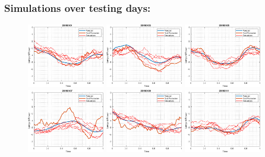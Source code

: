 \documentclass[aspectratio=169]{beamer}\usepackage[utf8]{inputenc}
\begin{document}
\begin{frame}\frametitle{Simulations over testing days:}

\begin{figure}[ht!]
\centering
\includegraphics[width=0.3\textwidth]{../../MATLAB_Files/Results/paths_testing_days/lamperti_optimal/1.eps}
\includegraphics[width=0.3\textwidth]{../../MATLAB_Files/Results/paths_testing_days/lamperti_optimal/2.eps}
\includegraphics[width=0.3\textwidth]{../../MATLAB_Files/Results/paths_testing_days/lamperti_optimal/3.eps}
\includegraphics[width=0.3\textwidth]{../../MATLAB_Files/Results/paths_testing_days/lamperti_optimal/4.eps}
\includegraphics[width=0.3\textwidth]{../../MATLAB_Files/Results/paths_testing_days/lamperti_optimal/5.eps}
\includegraphics[width=0.3\textwidth]{../../MATLAB_Files/Results/paths_testing_days/lamperti_optimal/6.eps}
\end{figure}

\end{frame}
\end{document}

